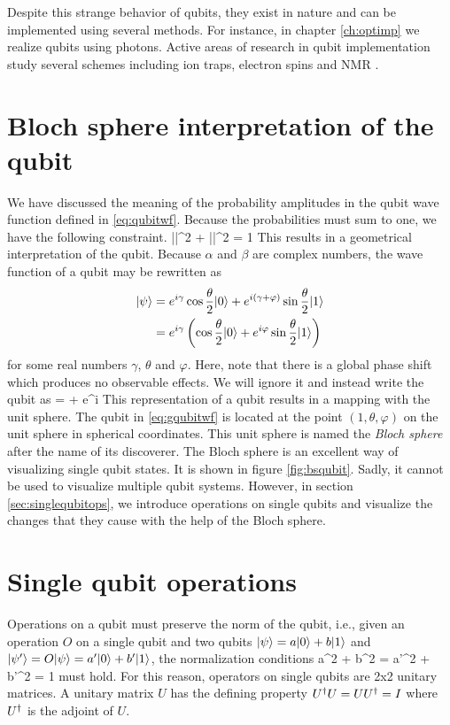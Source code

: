 Despite this strange behavior of qubits, they exist in nature and can be implemented using several methods. For instance, in chapter \ref{ch:optimp} we realize qubits using photons. Active areas of research in qubit implementation study several schemes including ion traps, electron spins and NMR \cite{nielsen2000}. 

\section{Bloch sphere interpretation of the qubit}
We have discussed the meaning of the probability amplitudes in the qubit wave function defined in \eqref{eq:qubitwf}. Because the probabilities must sum to one, we have the following constraint.
\beq
|\alpha|^2 + |\beta|^2 = 1
\eeq
This results in a geometrical interpretation of the qubit. Because $\alpha$ and $\beta$ are complex numbers, the wave function of a qubit may be rewritten as
\begin{align}
|\psi\rangle &= e^{i\gamma}\cos\frac{\theta}{2}|0\rangle + e^{i(\gamma + \varphi)}\sin\frac{\theta}{2}|1\rangle\\
&= e^{i\gamma}\left(\cos\frac{\theta}{2}|0\rangle + e^{i\varphi}\sin\frac{\theta}{2}|1\rangle\right)
\end{align}
for some real numbers $\gamma$, $\theta$ and $\varphi$. Here, note that there is a global phase shift which produces no observable effects. We will ignore it and instead write the qubit as
\beq
\label{eq:gqubitwf}
\ketp = \cos{} + e^{i\varphi}\sin{}
\eeq
{}
This representation of a qubit results in a mapping with the unit sphere. The qubit in \eqref{eq:gqubitwf} is located at the point $(1,\theta,\varphi)$ on the unit sphere in spherical coordinates. This unit sphere is named the \textit{Bloch sphere} after the name of its discoverer. The Bloch sphere is an excellent way of visualizing single qubit states. It is shown in figure \ref{fig:bsqubit}. Sadly, it cannot be used to visualize multiple qubit systems. However, in section \ref{sec:singlequbitops}, we introduce operations on single qubits and visualize the changes that they cause with the help of the Bloch sphere.

\section{Single qubit operations\label{sec:singlequbitops}}
Operations on a qubit must preserve the norm of the qubit, i.e., given an operation $O$ on a single qubit and two qubits $|\psi\rangle = a|0\rangle + b|1\rangle$ and $|\psi'\rangle = O|\psi\rangle = a'|0\rangle + b'|1\rangle$, the normalization conditions
\beq
a^2 + b^2 = a'^2 + b'^2 = 1
\eeq
must hold. For this reason, operators on single qubits are 2x2 unitary matrices. A unitary matrix $U$ has the defining property $U^\dagger U = UU^\dagger = I$ where $U^\dagger$ is the adjoint of $U$. 

